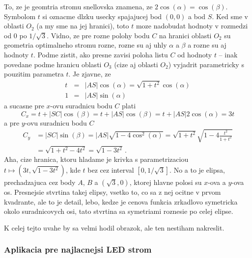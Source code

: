 \documentclass[12pt]{book}
\begin{document}
To, ze je geomtria stromu snellovska znamena, ze $2\cos(\alpha) = \cos(\beta)$.
Symbolom $t$ si oznacme dlzku usecky spajajucej bod $(0,0)$ a bod $S$.
Ked sme v oblasti $O_{2}$ (a my sme na jej hranici), toto $t$ moze nadobudat
    hodnoty v rozmedzi od $0$ po $1/\sqrt{3}$.
Vidno, ze pre rozne polohy bodu $C$ na hranici oblasti $O_{2}$ su geometria
    optimalneho stromu rozne, rozne su aj uhly $\alpha$ a $\beta$ a rozne su
    aj hodnoty $t$.
Podme zistit, ako presne zavisi poloha listu $C$ od hodnoty $t$ -- inak
    povedane podme hranicu oblasti $O_{3}$ (cize aj oblasti $O_{2}$) vyjadrit
    parametricky s pouzitim parametra $t$.
Je zjavne, ze
    \begin{eqnarray*}
         t &=& |AS|\cos(\alpha) = \sqrt{1+t^{2}}\cos(\alpha) \\
         1 &=& |AS|\sin(\alpha)
    \end{eqnarray*}
    a sucasne pre $x$-ovu suradnicu bodu $C$ plati
    \begin{equation*}
        C_{x}
        =
        t + |SC|\cos(\beta)
        =
        t + |AS|\cos(\beta)
        =
        t + |AS|2\cos(\alpha)
        =
        3t
    \end{equation*}
    a pre $y$-ovu suradnicu bodu $C$
    \begin{align*}
        C_{y} & = |SC|\sin(\beta) = |AS|\sqrt{1-4\cos^{2}(\alpha)} = \sqrt{1+t^{2}}\sqrt{1-4\tfrac{t^{2}}{1+t^{2}}} \\
              & = \sqrt{1+t^{2}-4t^{2}} = \sqrt{1-3t^{2}}\,.
    \end{align*}
Aha, cize hranica, ktoru hladame je krivka s parametrizaciou
    $t\mapsto(3t,\sqrt{1-3t^{2}})$, kde $t$ bez cez interval $[0,1/\sqrt{3}]$.
No a to je elipsa, prechadzajuca cez body $A$, $B$ a $(\sqrt{3},0)$, ktorej
    hlavne polosi su $x$-ova a $y$-ova os.
Presnejsie stvrtina takej elipsy, vsetko to, co sa z nej ocitne v prvom
    kvadrante, ale to je detail, lebo, kedze je cenova funkcia zrkadlovo
    symetricka okolo suradnicovych osi, tato stvrtina sa symetriami roznesie
    po celej elipse.

K celej tejto uvahe by sa velmi hodil obrazok, ale ten nestiham nakreslit.

\subsubsection{Aplikacia pre najlacnejsi LED strom}
\end{document}
